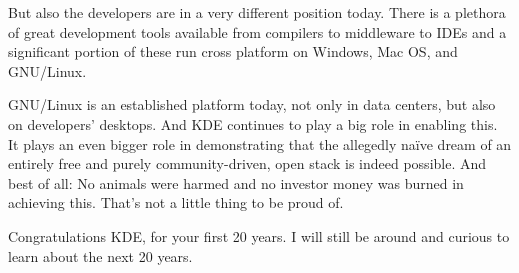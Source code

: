But also the developers are in a very different position today. There is a plethora of great development tools available from compilers to middleware to IDEs and a significant portion of these run cross platform on Windows, Mac OS, and GNU/Linux.
 
GNU/Linux is an established platform today, not only in data centers, but also on developers’ desktops. And KDE continues to play a big role in enabling this. It plays an even bigger role in demonstrating that the allegedly naïve dream of an entirely free and purely community-driven, open stack is indeed possible. And best of all: No animals were harmed and no investor money was burned in achieving this. That’s not a little thing to be proud of.
 
Congratulations KDE, for your first 20 years. I will still be around and curious to learn about the next 20 years.